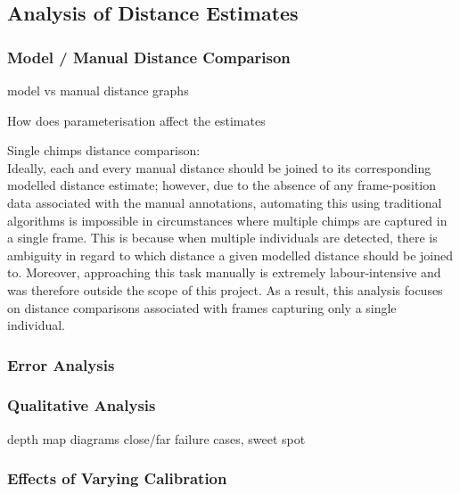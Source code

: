 \subsection{Analysis of Distance Estimates}

\subsubsection{Model / Manual Distance Comparison}\label{subsubsec:distance_comparison}

model vs manual distance graphs

How does parameterisation affect the estimates

Single chimps distance comparison:\\
Ideally, each and every manual distance should be joined to its corresponding modelled
distance estimate; however, due to the absence of any frame-position data associated
with the manual annotations, automating this using traditional algorithms is impossible
in circumstances where multiple chimps are captured in a single frame.
This is because when multiple individuals are detected, there is ambiguity in regard to
which distance a given modelled distance should be joined to.
Moreover, approaching this task manually is extremely labour-intensive and was therefore
outside the scope of this project.
As a result, this analysis focuses on distance comparisons associated with frames capturing
only a single individual.

\subsubsection{Error Analysis}

\subsubsection{Qualitative Analysis}
depth map diagrams
close/far failure cases, sweet spot

\subsubsection{Effects of Varying Calibration}